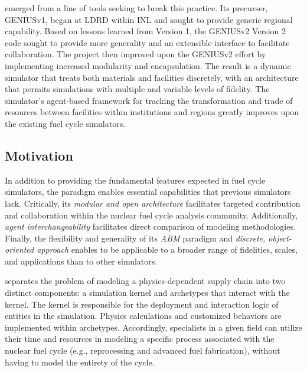 \Cyclus emerged from a line of tools seeking to break this practice.  
Its precurser,
\gls{GENIUSv1}\cite{dunzik-gougar_global_2007,jain_transitioning_2006}, began
at \gls{LDRD} within \gls{INL} and sought 
to provide generic regional capability.  Based on lessons learned from 
Version 1, the 
\acrshort{GENIUSv2} Version 2\cite{oliver_studying_2009,huff_geniusv2_2009} code sought to 
provide more generality and an extensible interface to facilitate 
collaboration.  The \Cyclus project then improved upon the \acrshort{GENIUSv2} 
effort by implementing increased modularity and encapsulation.  The result is  
a dynamic simulator that treats both materials and facilities discretely, with 
an architecture that permits simulations with multiple and variable levels of 
fidelity. The simulator's agent-based framework for tracking the 
transformation and trade of resources between facilities within institutions 
and regions greatly improves upon the existing fuel cycle simulators.

\subsection{Motivation}

In addition to providing the fundamental features expected in fuel cycle 
simulators, the \Cyclus paradigm enables essential capabilities that previous 
simulators lack. Critically, its \emph{modular and open architecture}  facilitates 
targeted contribution and collaboration within the nuclear fuel cycle analysis 
community.  Additionally, \emph{agent interchangeability} facilitates direct 
comparison of modeling methodologies. Finally, the flexibility and generality 
of its \emph{\gls{ABM}} paradigm and \emph{discrete, object-oriented approach} 
enables \Cyclus to be applicable to a broader range of 
fidelities, scales, and applications than to other simulators. 

\Cyclus separates the problem of modeling a
physics-dependent supply chain into two distinct components: a simulation kernel and archetypes that
interact with the kernel. The kernel is responsible for the
deployment and interaction logic of entities in the simulation.  Physics calculations and 
customized behaviors are implemented within archetypes. Accordingly, specialists
in a given field can utilize their time and resources in modeling a specific
process associated with the nuclear fuel cycle (e.g., reprocessing and advanced
fuel fabrication), without having to model the entirety of the cycle.

